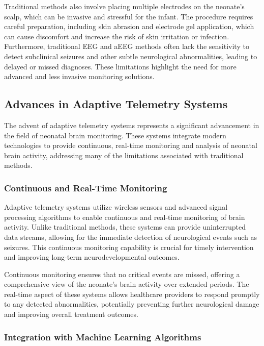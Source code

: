 \documentclass[12pt,journal,compsoc]{IEEEtran}
\begin{document}
Traditional methods also involve placing multiple electrodes on the neonate's scalp, which can be invasive and stressful for the infant. The procedure requires careful preparation, including skin abrasion and electrode gel application, which can cause discomfort and increase the risk of skin irritation or infection. Furthermore, traditional EEG and aEEG methods often lack the sensitivity to detect subclinical seizures and other subtle neurological abnormalities, leading to delayed or missed diagnoses. These limitations highlight the need for more advanced and less invasive monitoring solutions.

\subsection{Advances in Adaptive Telemetry Systems}

The advent of adaptive telemetry systems represents a significant advancement in the field of neonatal brain monitoring. These systems integrate modern technologies to provide continuous, real-time monitoring and analysis of neonatal brain activity, addressing many of the limitations associated with traditional methods.

\subsubsection{Continuous and Real-Time Monitoring}

Adaptive telemetry systems utilize wireless sensors and advanced signal processing algorithms to enable continuous and real-time monitoring of brain activity. Unlike traditional methods, these systems can provide uninterrupted data streams, allowing for the immediate detection of neurological events such as seizures. This continuous monitoring capability is crucial for timely intervention and improving long-term neurodevelopmental outcomes.

Continuous monitoring ensures that no critical events are missed, offering a comprehensive view of the neonate's brain activity over extended periods. The real-time aspect of these systems allows healthcare providers to respond promptly to any detected abnormalities, potentially preventing further neurological damage and improving overall treatment outcomes.

\subsubsection{Integration with Machine Learning Algorithms}
\end{document}
